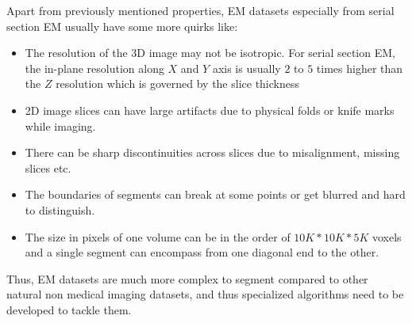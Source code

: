 Apart from previously mentioned properties, EM datasets especially from serial section EM usually have some more quirks like:
\begin{itemize}
  \item The resolution of the 3D image may not be isotropic. For serial section EM, the in-plane resolution along $X$ and $Y$ axis is usually $2$ to $5$ times higher than the $Z$ resolution which is governed by the slice thickness 
  \item 2D image slices can have large artifacts due to physical folds or knife marks while imaging.
  \item There can be sharp discontinuities across slices due to misalignment, missing slices etc.
  \item The boundaries of segments can break at some points or get blurred and hard to distinguish.
  \item The size in pixels of one volume can be in the order of $10K*10K*5K$ voxels and a single segment can encompass from one diagonal end to the other.
\end{itemize}

Thus, EM datasets are much more complex to segment compared to other natural non medical imaging datasets, and thus specialized algorithms need to be developed to tackle them.


